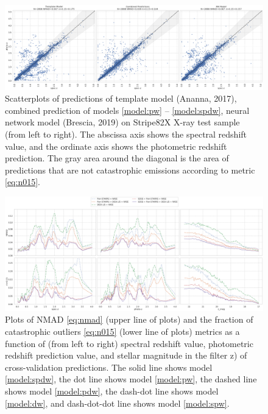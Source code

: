 \documentclass[fleqn,usenatbib]{mnras}
\begin{document}
\begin{figure}
    \centering
    \includegraphics[width=0.9\linewidth]{images/scatterplots-stripe82x-sota-combined.png}
    \caption{Scatterplots of predictions of template model (Ananna, 2017), combined prediction of models \ref{model:pw} -- \ref{model:spdw}, neural network model (Brescia, 2019) on Stripe82X X-ray test sample (from left to right). The abscissa axis shows the spectral redshift value, and the ordinate axis shows the photometric redshift prediction. The gray area around the diagonal is the area of predictions that are not catastrophic emissions according to metric \eqref{eq:n015}.}
    \label{fig:s82x-sota35}
\end{figure}

\begin{figure}
    \centering
    \includegraphics[width=0.9\linewidth]{images/metrics-cv2-ab-mini.png}
    \caption{Plots of NMAD \eqref{eq:nmad} (upper line of plots) and the fraction of catastrophic outliers \eqref{eq:n015} (lower line of plots) metrics as a function of (from left to right) spectral redshift value, photometric redshift prediction value, and stellar magnitude in the filter z) of cross-validation predictions. The solid line shows model \ref{model:spdw}, the dot line shows model \ref{model:pw}, the dashed line shows model \ref{model:pdw}, the dash-dot line shows model \ref{model:dw}, and dash-dot-dot line shows model \ref{model:spw}.}
    \label{fig:metrics-cv2-ab}
\end{figure}
\end{document}
